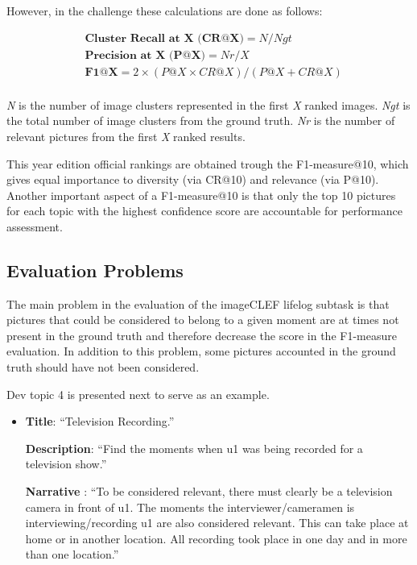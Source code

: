         However, in the challenge these calculations are done as follows:

        \begin{align*}
            &\textbf{Cluster Recall at X (CR@X)}  =  N / Ngt \\ 
            &\textbf{Precision at X (P@X)} = Nr / X \\ 
            &\textbf{F1@X}  =  2\times(P@X \times CR@X)/(P@X + CR@X) \\ 
        \end{align*}

        \textit{N} is the number of image clusters represented in the first \textit{X} ranked images. \textit{Ngt} is the total number of image clusters from the ground truth. \textit{Nr} is the number of relevant pictures from the first \textit{X} ranked results.

        This year edition official rankings are obtained trough the F1-measure@10, which gives equal importance to diversity (via CR@10) and relevance (via P@10). Another important aspect of a F1-measure@10 is that only the top 10 pictures for each topic with the highest confidence score are accountable for performance assessment.



     
  
        
    \subsection{Evaluation Problems}
    \label{sec:ev_problems}

    The main problem in the evaluation of the imageCLEF lifelog subtask is that  pictures that could be considered to belong to a given moment are at times not present in the ground truth and therefore decrease the score in the F1-measure evaluation. In addition to this problem, some pictures accounted in the ground truth should have not been considered.

    Dev topic 4 is presented next to serve as an example.

    \begin{itemize}

        \item[] \textbf{Title}: \enquote{Television Recording.}

        \textbf{Description}: \enquote{Find the moments when u1 was being recorded for
        a television show.}

        \textbf{Narrative} : \enquote{To be considered relevant, there must clearly be a television camera in front of u1. The moments the interviewer/cameramen is interviewing/recording u1 are also considered relevant. This can take place at home or in another location. All recording took place in one day and in more than one location.}

    \end{itemize}


